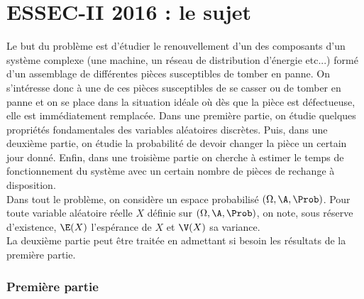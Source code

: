\chapter*{ESSEC-II 2016 : le sujet}
  
%

\noindent
Le but du problème est d'étudier le renouvellement d'un des composants 
d'un système complexe (une machine, un réseau de distribution d'énergie 
etc...) formé d'un assemblage de différentes pièces susceptibles de 
tomber en panne. On s'intéresse donc à une de ces pièces susceptibles de 
se casser ou de tomber en panne et on se place dans la situation idéale 
où dès que la pièce est défectueuse, elle est immédiatement remplacée. 
Dans une première partie, on étudie quelques propriétés fondamentales 
des variables aléatoires discrètes. Puis, dans une deuxième partie, on 
étudie la probabilité de devoir changer la pièce un certain jour donné. 
Enfin, dans une troisième partie on cherche à estimer le temps de 
fonctionnement du système avec un certain nombre de pièces de rechange à 
disposition.\\
Dans tout le problème, on considère un espace probabilisé $(\Omega, 
\A, \Prob)$. Pour toute variable aléatoire réelle $X$ définie sur 
$(\Omega, \A, \Prob)$, on note, sous réserve d'existence, $\E(X)$ 
l'espérance de $X$ et $\V(X)$ sa variance.\\
La deuxième partie peut être traitée en admettant si besoin les 
résultats de la première partie.

\subsection*{Première partie}

